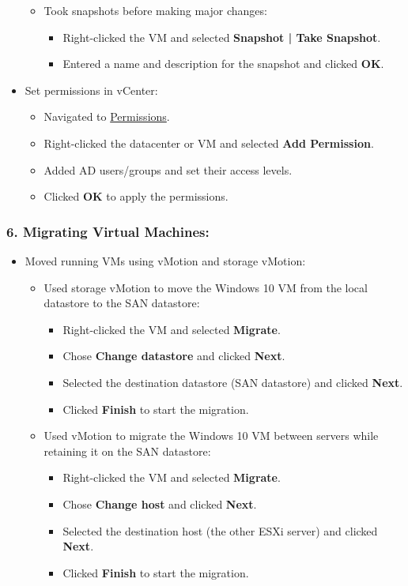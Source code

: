 \documentclass[letterpaper]{article}
\begin{document}
\begin{itemize}
\begin{itemize}
\item Took snapshots before making major changes:
\begin{itemize}
\item Right-clicked the VM and selected \textbf{Snapshot | Take Snapshot}.
\item Entered a name and description for the snapshot and clicked \textbf{OK}.
\end{itemize}
\end{itemize}
\item Set permissions in vCenter:
\begin{itemize}
\item Navigated to \uline{Permissions}.
\item Right-clicked the datacenter or VM and selected \textbf{Add Permission}.
\item Added AD users/groups and set their access levels.
\item Clicked \textbf{OK} to apply the permissions.
\end{itemize}
\end{itemize}

\subsubsection{6. Migrating Virtual Machines:}
\label{sec:orga1cc1d7}
\begin{itemize}
\item Moved running VMs using vMotion and storage vMotion:
\begin{itemize}
\item Used storage vMotion to move the Windows 10 VM from the local datastore to the SAN datastore:
\begin{itemize}
\item Right-clicked the VM and selected \textbf{Migrate}.
\item Chose \textbf{Change datastore} and clicked \textbf{Next}.
\item Selected the destination datastore (SAN datastore) and clicked \textbf{Next}.
\item Clicked \textbf{Finish} to start the migration.
\end{itemize}
\item Used vMotion to migrate the Windows 10 VM between servers while retaining it on the SAN datastore:
\begin{itemize}
\item Right-clicked the VM and selected \textbf{Migrate}.
\item Chose \textbf{Change host} and clicked \textbf{Next}.
\item Selected the destination host (the other ESXi server) and clicked \textbf{Next}.
\item Clicked \textbf{Finish} to start the migration.
\end{itemize}
\end{itemize}
\end{itemize}
\end{document}
